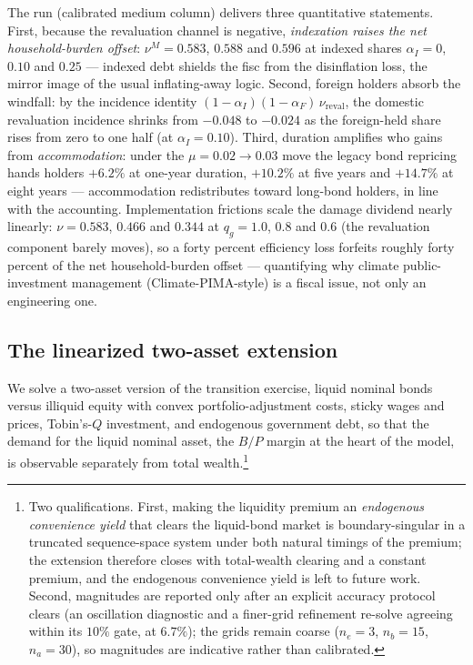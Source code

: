 \documentclass[12pt]{article}
\begin{document}
The run (calibrated medium column) delivers three quantitative statements.
First, because the revaluation channel is negative, \emph{indexation raises
the net household-burden offset}: $\nu^{M} = 0.583$, $0.588$ and $0.596$ at indexed
shares $\alpha_I = 0$, $0.10$ and $0.25$ --- indexed debt shields the fisc
from the disinflation loss, the mirror image of the usual
inflating-away logic. Second, foreign holders absorb the windfall: by the
incidence identity $(1-\alpha_I)(1-\alpha_F)\,\nu_{\mathrm{reval}}$, the
domestic revaluation incidence shrinks from $-0.048$ to $-0.024$ as the
foreign-held share rises from zero to one half (at $\alpha_I = 0.10$).
Third, duration amplifies who gains from \emph{accommodation}: under the
$\mu = 0.02 \to 0.03$ move the legacy bond repricing hands holders
$+6.2\%$ at one-year duration, $+10.2\%$ at five years and $+14.7\%$ at
eight years --- accommodation redistributes toward long-bond
holders, in line with the \citet{hallsargent2011} accounting.
Implementation frictions scale the damage dividend nearly linearly:
$\nu = 0.583$, $0.466$ and $0.344$ at $q_g = 1.0$, $0.8$ and $0.6$
(the revaluation component barely moves), so a forty
percent efficiency loss forfeits roughly forty percent of the net
household-burden offset
--- quantifying why climate public-investment management
(Climate-PIMA-style) is a fiscal issue, not only an engineering one.

\subsection{The linearized two-asset extension}\label{subsec:twoasset}

We solve a
two-asset version of the transition exercise, liquid nominal bonds versus illiquid
equity with convex portfolio-adjustment costs, sticky wages and prices,
Tobin's-$Q$ investment, and endogenous government debt, so that the
demand for the liquid nominal asset, the $B/P$ margin at the heart of the
model, is observable separately from total wealth.\footnote{Two
qualifications. First, making the liquidity premium an \emph{endogenous
convenience yield} that clears the liquid-bond market is boundary-singular
in a truncated sequence-space system under both natural timings of the
premium; the extension therefore closes with total-wealth clearing and a
constant premium, and the endogenous convenience yield is left to future
work. Second, magnitudes are reported only after an explicit accuracy
protocol clears (an oscillation diagnostic and a finer-grid refinement
re-solve agreeing within its $10\%$ gate, at $6.7\%$); the grids remain
coarse ($n_e=3$, $n_b=15$, $n_a=30$), so magnitudes are indicative rather
than calibrated.}
\end{document}
